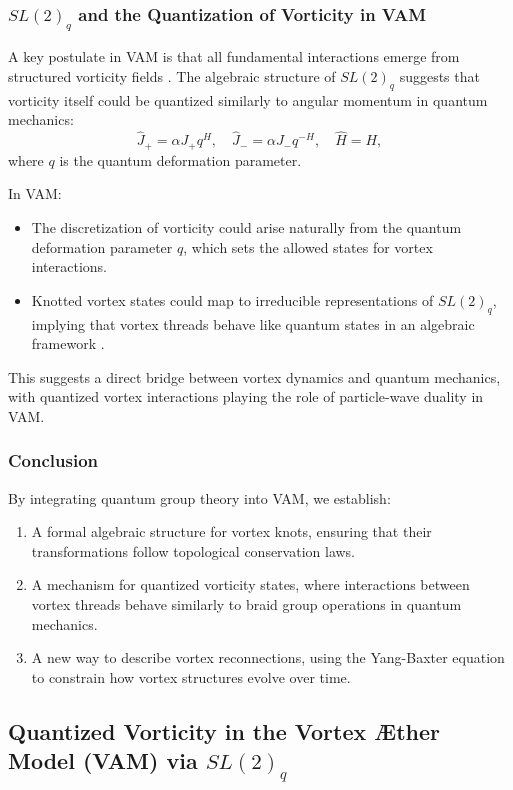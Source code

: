 \documentclass[a4paper,10pt]{article}
\begin{document}
\subsubsection*{$SL(2)_q$ and the Quantization of Vorticity in VAM}
A key postulate in VAM is that all fundamental interactions emerge from structured vorticity fields \cite{iskandarani_vortex_2025}. The algebraic structure of $SL(2)_q$ suggests that vorticity itself could be quantized similarly to angular momentum in quantum mechanics:
\begin{equation*}
    \hat{J}_+ = \alpha J_+ q^{H}, \quad \hat{J}_- = \alpha J_- q^{-H}, \quad \hat{H} = H,
\end{equation*}
where $q$ is the quantum deformation parameter.

In VAM:
\begin{itemize}
    \item The discretization of vorticity could arise naturally from the quantum deformation parameter $q$, which sets the allowed states for vortex interactions.
    \item Knotted vortex states could map to irreducible representations of $SL(2)_q$, implying that vortex threads behave like quantum states in an algebraic framework \cite{sl2q_quantization}.
\end{itemize}

This suggests a direct bridge between vortex dynamics and quantum mechanics, with quantized vortex interactions playing the role of particle-wave duality in VAM.

\subsubsection*{Conclusion}
By integrating quantum group theory into VAM, we establish:
\begin{enumerate}
    \item A formal algebraic structure for vortex knots, ensuring that their transformations follow topological conservation laws.
    \item A mechanism for quantized vorticity states, where interactions between vortex threads behave similarly to braid group operations in quantum mechanics.
    \item A new way to describe vortex reconnections, using the Yang-Baxter equation to constrain how vortex structures evolve over time.
\end{enumerate}

    \subsection{Quantized Vorticity in the Vortex Æther Model (VAM) via $SL(2)_q$}
\end{document}
